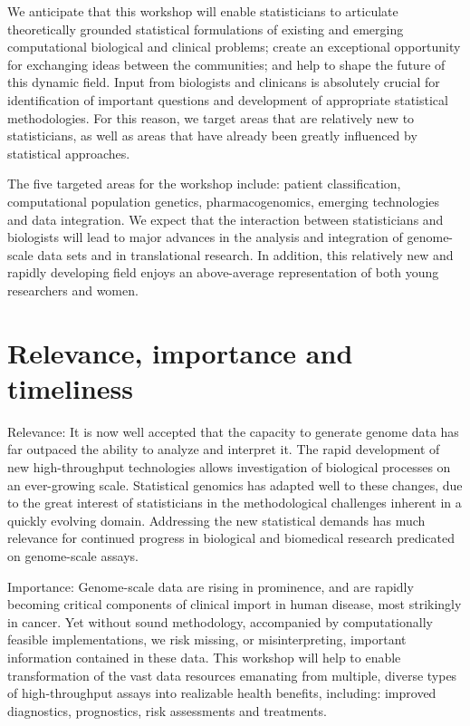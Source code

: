 \documentclass[12pt]{amsart}
\begin{document}
We anticipate that this workshop will enable statisticians to
articulate theoretically grounded statistical formulations of existing and
emerging computational biological and clinical problems; create an exceptional
opportunity for exchanging ideas between the communities; and help to
shape the future of this dynamic field. 
Input from biologists and clinicans is absolutely crucial for identification of important questions and development of
appropriate statistical methodologies. 
For this reason, we target areas that are relatively
new to statisticians, as well as areas
that have already been greatly influenced by statistical approaches.

The five targeted areas for the workshop include: patient classification, 
computational population genetics, pharmacogenomics, 
emerging technologies and data integration. 
We expect that the interaction between statisticians
and biologists will lead to major advances in
the analysis and integration of genome-scale data sets and in translational research. 
In addition, this relatively new and rapidly developing field 
enjoys an above-average representation of both young researchers and women.  

\section*{Relevance, importance and timeliness} 

Relevance:  
It is now well accepted that the capacity to generate genome data 
has far outpaced the ability to analyze and interpret it.
The rapid development of new high-throughput technologies
allows investigation of biological processes on an ever-growing scale.
Statistical genomics has adapted well to these changes, 
due to the great interest of statisticians in the methodological challenges
inherent in a quickly evolving domain.
Addressing the new statistical demands has much relevance
for continued progress in biological and biomedical research
predicated on genome-scale assays.

Importance:  
Genome-scale data are rising in prominence, 
and are rapidly becoming critical components of clinical import
in human disease, most strikingly in cancer.
Yet without sound methodology, accompanied by computationally feasible implementations,
we risk missing, or misinterpreting, important information contained in these data.
This workshop will help to enable transformation of the vast data resources 
emanating from multiple, diverse types
of high-throughput assays into realizable health benefits, 
including:  improved diagnostics,
prognostics, risk assessments and treatments.
\end{document}
